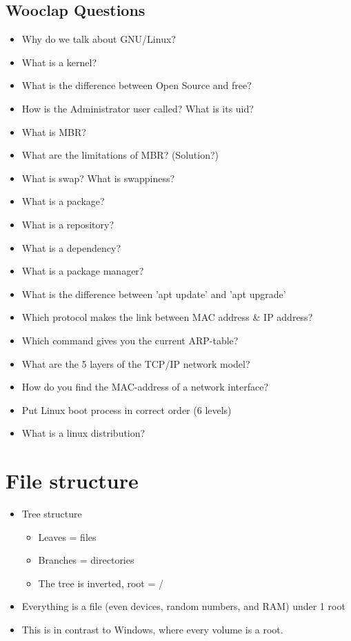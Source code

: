 \documentclass{article}
\begin{document}
\subsection{Wooclap Questions}

\begin{itemize}
    \item Why do we talk about GNU/Linux?
    \item What is a kernel?
    \item What is the difference between Open Source and free?
    \item How is the Administrator user called? What is its uid?
    \item What is MBR?
    \item What are the limitations of MBR? (Solution?)
    \item What is swap? What is swappiness?
    \item What is a package?
    \item What is a repository?
    \item What is a dependency?
    \item What is a package manager?
    \item What is the difference between 'apt update' and 'apt upgrade'
    \item Which protocol makes the link between MAC address \& IP address?
    \item Which command gives you the current ARP-table?
    \item What are the 5 layers of the TCP/IP network model?
    \item How do you find the MAC-address of a network interface?
    \item Put Linux boot process in correct order (6 levels)
    \item What is a linux distribution?
\end{itemize}

\section{File structure}

\begin{itemize}
    \item Tree structure
    \begin{itemize}
        \item Leaves = files
        \item Branches = directories
        \item The tree is inverted, root = /
    \end{itemize}
    \item Everything is a file (even devices, random numbers, and RAM) under 1 root
    \item This is in contrast to Windows, where every volume is a root.
\end{itemize}
\end{document}

